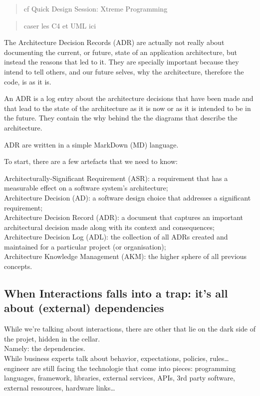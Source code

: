 \begin{quote}
cf Quick Design Session: Xtreme Programming
\end{quote}

\begin{quote}
caser les C4 et UML ici
\end{quote}

The Architecture Decision Records (ADR) are actually not really about
documenting the current, or future, state of an application
architecture, but instead the reasons that led to it. They are specially
important because they intend to tell others, and our future selves, why
the architecture, therefore the code, is as it is.

An ADR is a log entry about the architecture decisions that have been
made and that lead to the state of the architecture as it is now or as
it is intended to be in the future. They contain the why behind the the
diagrams that describe the architecture.

ADR are written in a simple MarkDown (MD) language.

To start, there are a few artefacts that we need to know:

Architecturally-Significant Requirement (ASR): a requirement that has a
measurable effect on a software system's architecture;\\Architecture
Decision (AD): a software design choice that addresses a significant
requirement;\\Architecture Decision Record (ADR): a document that
captures an important architectural decision made along with its context
and consequences;\\Architecture Decision Log (ADL): the collection of
all ADRs created and maintained for a particular project (or
organisation);\\Architecture Knowledge Management (AKM): the higher
sphere of all previous concepts.

\subsection{When Interactions falls into a trap: it's all about
(external)
dependencies}\label{when-interactions-falls-into-a-trap-its-all-about-external-dependencies}

While we're talking about interactions, there are other that lie on the
dark side of the projet, hidden in the cellar.\\Namely: the
dependencies.\\While business experts talk about behavior, expectations,
policies, rules\ldots{} engineer are still facing the technologie that
come into pieces: programming languages, framework, libraries, external
services, APIs, 3rd party software, external ressources, hardware
links\ldots{}

